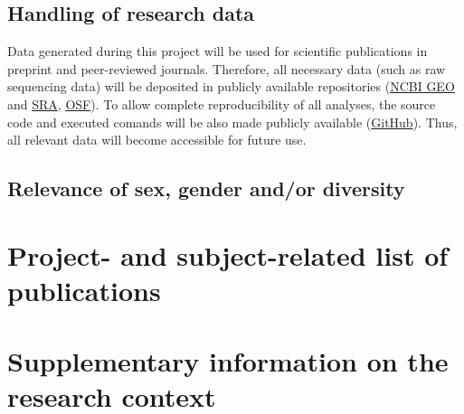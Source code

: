 \documentclass{scrartcl}
\begin{document}
\subsection{Handling of research data}
Data generated during this project will be used for scientific publications in
preprint and peer-reviewed journals. Therefore, all necessary data (such as raw
sequencing data) will be deposited in publicly available repositories
(\href{https://www.ncbi.nlm.nih.gov/geo/}{NCBI GEO} and
\href{https://www.ncbi.nlm.nih.gov/sra}{SRA}, \href{https://osf.io/}{OSF}). To
allow complete reproducibility of all analyses, the source code and executed
comands will be also made publicly available
(\href{https://github.com/}{GitHub}).  Thus, all relevant data will become
accessible for future use. 

\subsection{Relevance of sex, gender and/or diversity}

\section{Project- and subject-related list of publications}
\label{sec:bib}
\newrefcontext[labelprefix=]
\printbibliography[notcategory=reviewed, notcategory=nonreviewed, notcategory=patents_pending, notcategory=patents, heading=none, env=bibliographyNUM]	

\backmatter
\section{Supplementary information on the research context}
\end{document}
